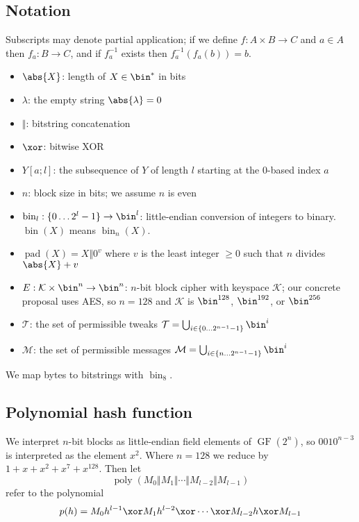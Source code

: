 \documentclass[letterpaper,11pt]{article}
\newcommand*{\Concat}{\Vert}
\DeclareMathOperator{\fromint}{bin}
\DeclareMathOperator{\GF}{GF}
\DeclareMathOperator{\pad}{pad}
\DeclareMathOperator{\poly}{poly}
\begin{document}
\subsection{Notation}
Subscripts may denote partial application; if we define $f: A \times B \rightarrow C$ and
$a \in A$ then $f_a: B \rightarrow C$, and if $f_a^{-1}$ exists then $f_a^{-1}(f_a(b)) = b$.
\begin{itemize}
    \item $\abs{X}$: length of $X \in \bin^{*}$ in bits
    \item $\lambda$: the empty string $\abs{\lambda} = 0$
    \item $\Concat$: bitstring concatenation
    \item \(\xor\): bitwise XOR
    \item $Y[a;l]$: the subsequence of $Y$ of length $l$ starting at the 0-based index $a$
    \item \(n\): block size in bits; we assume \(n\) is even
    \item $\fromint_l: \{0 \ldots 2^l-1\} \rightarrow \bin^l$:
    little-endian conversion of integers to binary. 
    \(\fromint(X)\) means \(\fromint_n(X)\).
    \item $\pad(X) = X \Concat 0^v$
    where $v$ is the least integer $\geq 0$ such that $n$ divides $\abs{X} + v$
    \item \(E: \mathcal{K} \times \bin^n \rightarrow \bin^n\): 
    \(n\)-bit block cipher with keyspace \(\mathcal{K}\);
    our concrete proposal uses AES, so \(n=128\) and \(\mathcal{K}\) is
    \(\bin^{128}\), \(\bin^{192}\), or \(\bin^{256}\)
    \item \(\mathcal{T}\): the set of permissible tweaks
    \(\mathcal{T} = \bigcup_{i \in \{0\ldots2^{n-1}-1\}}\bin^i\)
    \item \(\mathcal{M}\): the set of permissible messages
    \(\mathcal{M} = \bigcup_{i \in \{n\ldots2^{n-1}-1\}}\bin^i\)
\end{itemize}
We map bytes to bitstrings with \(\fromint_8\).

\subsection{Polynomial hash function}
We interpret \(n\)-bit blocks as little-endian field elements of \(\GF(2^n)\),
so \(0010^{n-3}\) is interpreted as the element \(x^2\).
Where \(n=128\) we reduce by
\(1 + x + x^2 + x^7 + x^{128}\). Then let
\begin{displaymath}
    \poly(M_0 \Concat M_1 \Concat \cdots \Concat M_{l-2} \Concat M_{l-1})
\end{displaymath}
refer to the polynomial
\begin{displaymath}
    p(h) = M_0h^{l-1} \xor M_1h^{l-2} \xor \cdots \xor M_{l-2}h \xor M_{l-1}
\end{displaymath}
\end{document}
